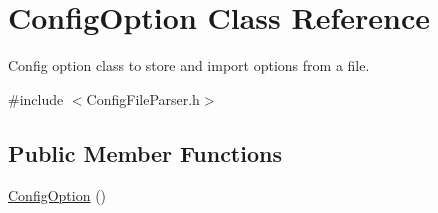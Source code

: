 \hypertarget{class_config_option}{}\section{Config\+Option Class Reference}
\label{class_config_option}


Config option class to store and import options from a file.  




{\ttfamily \#include $<$Config\+File\+Parser.\+h$>$}

\subsection*{Public Member Functions}
\begin{DoxyCompactItemize}
\item 
\hyperlink{class_config_option_ac0639cf9fc6660b1436ebc9e7af52525}{Config\+Option} ()\hypertarget{class_config_option_ac0639cf9fc6660b1436ebc9e7af52525}{}\label{class_config_option_ac0639cf9fc6660b1436ebc9e7af52525}


\end{DoxyCompactItemize}
